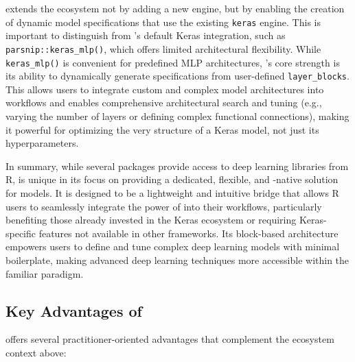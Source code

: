 extends the  ecosystem not by adding a new engine, but by enabling the creation of dynamic  model specifications that use the existing \texttt{keras} engine. This is important to distinguish from 's default Keras integration, such as \texttt{parsnip::keras\_mlp()}, which offers limited architectural flexibility. While \texttt{keras\_mlp()} is convenient for predefined MLP architectures, 's core strength is its ability to dynamically generate specifications from user-defined \texttt{layer\_blocks}. This allows users to integrate custom and complex model architectures into  workflows and enables comprehensive architectural search and tuning (e.g., varying the number of layers or defining complex functional connections), making it powerful for optimizing the very structure of a Keras model, not just its hyperparameters.

In summary, while several packages provide access to deep learning libraries from R,  is unique in its focus on providing a dedicated, flexible, and -native solution for  models. It is designed to be a lightweight and intuitive bridge that allows R users to seamlessly integrate the power of  into their  workflows, particularly benefiting those already invested in the Keras ecosystem or requiring Keras-specific features not available in other frameworks. Its block-based architecture empowers users to define and tune complex deep learning models with minimal boilerplate, making advanced deep learning techniques more accessible within the familiar  paradigm.

\subsection{\texorpdfstring{Key Advantages of }{Key Advantages of }}\label{key-advantages-of}

 offers several practitioner-oriented advantages that complement the ecosystem context above:

